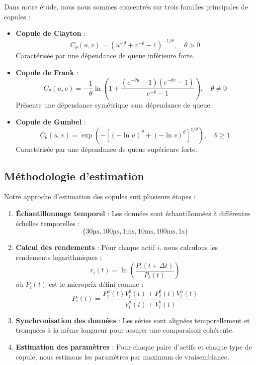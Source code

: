 \documentclass[10pt,a4paper]{article}
\theoremstyle{definition}
\theoremstyle{remark}
\begin{document}
\begin{itemize}
Dans notre étude, nous nous sommes concentrés sur trois familles principales de copules :

\begin{itemize}
    \item \textbf{Copule de Clayton} :
    \[C_\theta(u,v) = (u^{-\theta} + v^{-\theta} - 1)^{-1/\theta}, \quad \theta > 0\]
    Caractérisée par une dépendance de queue inférieure forte.
    
    \item \textbf{Copule de Frank} :
    \[C_\theta(u,v) = -\frac{1}{\theta}\ln\left(1 + \frac{(e^{-\theta u}-1)(e^{-\theta v}-1)}{e^{-\theta}-1}\right), \quad \theta \neq 0\]
    Présente une dépendance symétrique sans dépendance de queue.
    
    \item \textbf{Copule de Gumbel} :
    \[C_\theta(u,v) = \exp\left(-\left[(-\ln u)^\theta + (-\ln v)^\theta\right]^{1/\theta}\right), \quad \theta \geq 1\]
    Caractérisée par une dépendance de queue supérieure forte.
\end{itemize}

\subsection{Méthodologie d'estimation}

Notre approche d'estimation des copules suit plusieurs étapes :

\begin{enumerate}
    \item \textbf{Échantillonnage temporel} : Les données sont échantillonnées à différentes échelles temporelles :
    \[\{\text{30µs}, \text{100µs}, \text{1ms}, \text{10ms}, \text{100ms}, \text{1s}\}\]
    
    \item \textbf{Calcul des rendements} : Pour chaque actif $i$, nous calculons les rendements logarithmiques :
    \[r_i(t) = \ln\left(\frac{P_i(t+\Delta t)}{P_i(t)}\right)\]
    où $P_i(t)$ est le microprix défini comme :
    \[P_i(t) = \frac{P^a_i(t)V^b_i(t) + P^b_i(t)V^a_i(t)}{V^a_i(t) + V^b_i(t)}\]
    
    \item \textbf{Synchronisation des données} : Les séries sont alignées temporellement et tronquées à la même longueur pour assurer une comparaison cohérente.
    
    \item \textbf{Estimation des paramètres} : Pour chaque paire d'actifs et chaque type de copule, nous estimons les paramètres par maximum de vraisemblance.
\end{enumerate}


\end{itemize}
\end{document}
